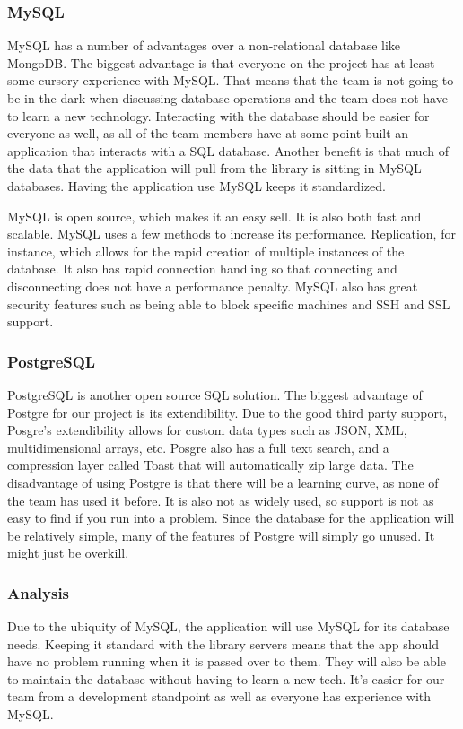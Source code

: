 \documentclass[letterpaper,10pt,titlepage, onecolumn, compsoc]{IEEEtran}
\begin{document}
\subsubsection{MySQL}
MySQL has a number of advantages over a non-relational database like MongoDB. The biggest advantage is that everyone on the project has at least some cursory experience with MySQL. That means that the team is not going to be in the dark when discussing database operations and the team does not have to learn a new technology. Interacting with the database should be easier for everyone as well, as all of the team members have at some point built an application that interacts with a SQL database. Another benefit is that much of the data that the application will pull from the library is sitting in MySQL databases. Having the application use MySQL keeps it standardized.\cite{10mySQLreasons}

MySQL is open source, which makes it an easy sell. It is also both fast and scalable. MySQL uses a few methods to increase its performance. Replication, for instance, which allows for the rapid creation of multiple instances of the database.  It also has rapid connection handling so that connecting and disconnecting does not have a performance penalty. MySQL also has great security features such as being able to block specific machines and SSH and SSL support. \cite{10mySQLreasons}


\subsubsection{PostgreSQL}
PostgreSQL is another open source SQL solution. The biggest advantage of Postgre for our project is its extendibility. Due to the good third party support, Posgre’s extendibility allows for custom data types such as JSON, XML, multidimensional arrays, etc. Posgre also has a full text search, and a compression layer called Toast that will automatically zip large data. The disadvantage of using Postgre is that there will be a learning curve, as none of the team has used it before. It is also not as widely used, so support is not as easy to find if you run into a problem. Since the database for the application will be relatively simple, many of the features of Postgre will simply go unused. It might just be overkill. \cite{PostgreSQL}

\subsubsection{Analysis}
Due to the ubiquity of MySQL, the application will use MySQL for its database needs. Keeping it standard with the library servers means that the app should have no problem running when it is passed over to them. They will also be able to maintain the database without having to learn a new tech. It’s easier for our team from a development standpoint as well as everyone has experience with MySQL.  		
\end{document}
